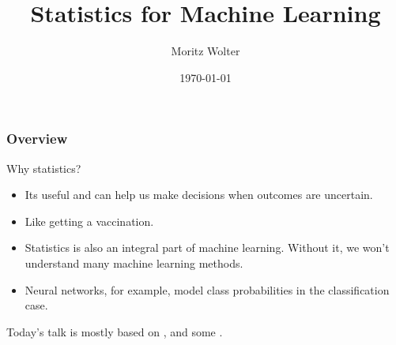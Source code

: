 \documentclass[notes]{beamer}
\title{Statistics for Machine Learning}
\date{\today}
\institute{High-Performance Computing and Analytics Lab, University of Bonn}
\author{Moritz Wolter}
\begin{document}
    \maketitle

    \begin{frame}
    \frametitle{Overview} 
    \tableofcontents

    \end{frame}


    \begin{frame}{Why statistics?}
      \begin{itemize}
        \item Its useful and can help us make decisions when outcomes are uncertain.
        \item Like getting a vaccination.
        \item Statistics is also an integral part of machine learning. Without it, we won't
         understand many machine learning methods.
        \item Neural networks, for example, model class probabilities in the classification case.
      \end{itemize}
      Today's talk is mostly based on \cite{haslwanter2016introduction},
      \cite{deisenroth2020mathematics} and some \cite{unpingco2016python}.
    \end{frame}
\end{document}
